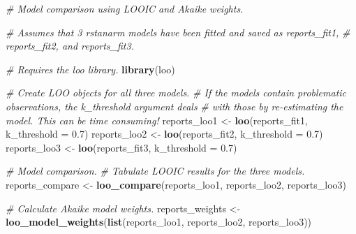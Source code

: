 \documentclass[doc]{apa6}
\newenvironment{Shaded}{\begin{snugshade}}{\end{snugshade}}
\newcommand{\KeywordTok}[1]{\textcolor[rgb]{0.13,0.29,0.53}{\textbf{#1}}}
\newcommand{\DataTypeTok}[1]{\textcolor[rgb]{0.13,0.29,0.53}{#1}}
\newcommand{\FloatTok}[1]{\textcolor[rgb]{0.00,0.00,0.81}{#1}}
\newcommand{\StringTok}[1]{\textcolor[rgb]{0.31,0.60,0.02}{#1}}
\newcommand{\CommentTok}[1]{\textcolor[rgb]{0.56,0.35,0.01}{\textit{#1}}}
\newcommand{\NormalTok}[1]{#1}
\begin{document}
\begin{Shaded}
\begin{Highlighting}[]
\CommentTok{# Model comparison using LOOIC and Akaike weights.}

\CommentTok{# Assumes that 3 rstanarm models have been fitted and saved as reports_fit1,}
\CommentTok{# reports_fit2, and reports_fit3.}

\CommentTok{# Requires the loo library.}
\KeywordTok{library}\NormalTok{(loo)}

\CommentTok{# Create LOO objects for all three models.}
\CommentTok{# If the models contain problematic observations, the k_threshold argument deals}
\CommentTok{# with those by re-estimating the model. This can be time consuming!}
\NormalTok{reports_loo1 <-}\StringTok{ }\KeywordTok{loo}\NormalTok{(reports_fit1, }\DataTypeTok{k_threshold =} \FloatTok{0.7}\NormalTok{)}
\NormalTok{reports_loo2 <-}\StringTok{ }\KeywordTok{loo}\NormalTok{(reports_fit2, }\DataTypeTok{k_threshold =} \FloatTok{0.7}\NormalTok{)}
\NormalTok{reports_loo3 <-}\StringTok{ }\KeywordTok{loo}\NormalTok{(reports_fit3, }\DataTypeTok{k_threshold =} \FloatTok{0.7}\NormalTok{)}

\CommentTok{# Model comparison.}
\CommentTok{# Tabulate LOOIC results for the three models.}
\NormalTok{reports_compare <-}\StringTok{ }\KeywordTok{loo_compare}\NormalTok{(reports_loo1, reports_loo2, reports_loo3)}

\CommentTok{# Calculate Akaike model weights.}
\NormalTok{reports_weights <-}\StringTok{ }\KeywordTok{loo_model_weights}\NormalTok{(}\KeywordTok{list}\NormalTok{(reports_loo1, reports_loo2, reports_loo3))}
\end{Highlighting}
\end{Shaded}

\begin{table}[H]

\caption{\label{tab:modelcomparison1}Three models arranged in descending order of predictive accuracy according to the approximate leave-one-out cross-validation information criterion (LOOIC).}
\centering
{}
\end{table}
\end{document}
